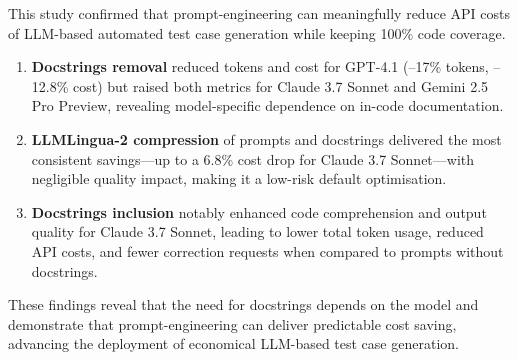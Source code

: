 This study confirmed that prompt-engineering can meaningfully reduce API costs of LLM-based automated test case generation while keeping 100\% code coverage.

\begin{enumerate}
    \item \textbf{Docstrings removal} reduced tokens and cost for GPT-4.1 (–17\% tokens, –12.8\% cost) but raised both metrics for Claude 3.7 Sonnet and Gemini 2.5 Pro Preview, revealing model-specific dependence on in-code documentation.
    \vspace{0.3cm}
    
    \item \textbf{LLMLingua-2 compression} of prompts and docstrings delivered the most consistent savings—up to a 6.8\% cost drop for Claude 3.7 Sonnet—with negligible quality impact, making it a low-risk default optimisation.
    \vspace{0.3cm}
    
    \item \textbf{Docstrings inclusion} notably enhanced code comprehension and output quality for Claude 3.7 Sonnet, leading to lower total token usage, reduced API costs, and fewer correction requests when compared to prompts without docstrings.
\end{enumerate}


These findings reveal that the need for docstrings depends on the model and demonstrate that prompt-engineering can deliver predictable cost saving, advancing the deployment of economical LLM-based test case generation.

